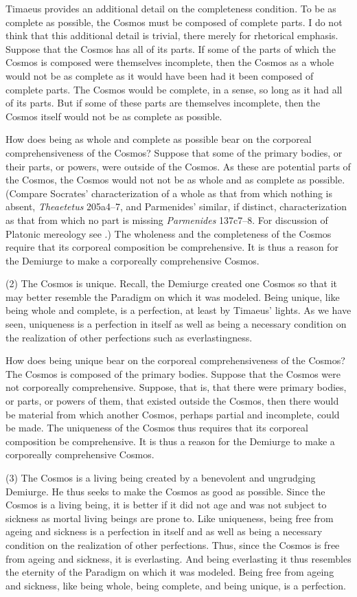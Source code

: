 Timaeus provides an additional detail on the completeness condition. To be as complete as possible, the Cosmos must be composed of complete parts. I do not think that this additional detail is trivial, there merely for rhetorical emphasis. Suppose that the Cosmos has all of its parts. If some of the parts of which the Cosmos is composed were themselves incomplete, then the Cosmos as a whole would not be as complete as it would have been had it been composed of complete parts. The Cosmos would be complete, in a sense, so long as it had all of its parts. But if some of these parts are themselves incomplete, then the Cosmos itself would not be as complete as possible.

How does being as whole and complete as possible bear on the corporeal comprehensiveness of the Cosmos? Suppose that some of the primary bodies, or their parts, or powers, were outside of the Cosmos. As these are potential parts of the Cosmos, the Cosmos would not not be as whole and as complete as possible. (Compare Socrates' characterization of a whole as that from which nothing is absent, \emph{Theaetetus} 205a4--7, and Parmenides' similar, if distinct, characterization as that from which no part is missing \emph{Parmenides} 137c7--8. For discussion of Platonic mereology see \citealt{Harte:2002tl}.) The wholeness and the completeness of the Cosmos require that its corporeal composition be comprehensive. It is thus a reason for the Demiurge to make a corporeally comprehensive Cosmos.

(2) The Cosmos is unique. Recall, the Demiurge created one Cosmos so that it may better resemble the Paradigm on which it was modeled. Being unique, like being whole and complete, is a perfection, at least by Timaeus' lights. As we have seen, uniqueness is a perfection in itself as well as being a necessary condition on the realization of other perfections such as everlastingness.

How does being unique bear on the corporeal comprehensiveness of the Cosmos? The Cosmos is composed of the primary bodies. Suppose that the Cosmos were not corporeally comprehensive. Suppose, that is, that there were primary bodies, or parts, or powers of them, that existed outside the Cosmos, then there would be material from which another Cosmos, perhaps partial and incomplete, could be made. The uniqueness of the Cosmos thus requires that its corporeal composition be comprehensive.  It is thus a reason for the Demiurge to make a corporeally comprehensive Cosmos.

(3) The Cosmos is a living being created by a benevolent and ungrudging Demiurge. He thus seeks to make the Cosmos as good as possible. Since the Cosmos is a living being, it is better if it did not age and was not subject to sickness as mortal living beings are prone to. Like uniqueness, being free from ageing and sickness is a perfection in itself and as well as being a necessary condition on the realization of other perfections. Thus, since the Cosmos is free from ageing and sickness, it is everlasting. And being everlasting it thus resembles the eternity of the Paradigm on which it was modeled. Being free from ageing and sickness, like being whole, being complete, and being unique, is a perfection.

